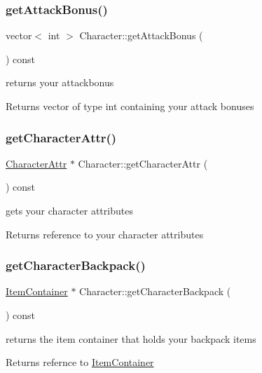 \subsubsection{\texorpdfstring{get\+Attack\+Bonus()}{getAttackBonus()}}
{\footnotesize\ttfamily vector$<$ int $>$ Character\+::get\+Attack\+Bonus (\begin{DoxyParamCaption}{ }\end{DoxyParamCaption}) const}

returns your attackbonus \begin{DoxyReturn}{Returns}
vector of type int containing your attack bonuses 
\end{DoxyReturn}
\hypertarget{class_character_a7334ab9ffc361aa1c69344ea35467931}{}\label{class_character_a7334ab9ffc361aa1c69344ea35467931} 
\subsubsection{\texorpdfstring{get\+Character\+Attr()}{getCharacterAttr()}}
{\footnotesize\ttfamily \hyperlink{class_character_attr}{Character\+Attr} $\ast$ Character\+::get\+Character\+Attr (\begin{DoxyParamCaption}{ }\end{DoxyParamCaption}) const}

gets your character attributes \begin{DoxyReturn}{Returns}
reference to your character attributes 
\end{DoxyReturn}
\hypertarget{class_character_a9b92a46740a48fceee9440961085515f}{}\label{class_character_a9b92a46740a48fceee9440961085515f} 
\subsubsection{\texorpdfstring{get\+Character\+Backpack()}{getCharacterBackpack()}}
{\footnotesize\ttfamily \hyperlink{class_item_container}{Item\+Container} $\ast$ Character\+::get\+Character\+Backpack (\begin{DoxyParamCaption}{ }\end{DoxyParamCaption}) const}

returns the item container that holds your backpack items \begin{DoxyReturn}{Returns}
refernce to \hyperlink{class_item_container}{Item\+Container} 
\end{DoxyReturn}
\hypertarget{class_character_a8c40b0753d44d6894cc0d3104017b0cc}{}\label{class_character_a8c40b0753d44d6894cc0d3104017b0cc} 

